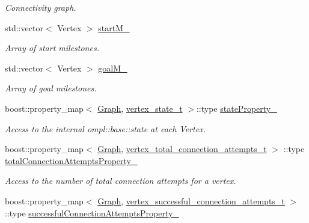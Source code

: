 \begin{DoxyCompactItemize}
\begin{DoxyCompactList}\small\item\em \-Connectivity graph. \end{DoxyCompactList}\item 
\hypertarget{class_f_i_r_m_a333c7dec34b4c0977f85424b9fc3dc21}{std\-::vector$<$ \-Vertex $>$ \hyperlink{class_f_i_r_m_a333c7dec34b4c0977f85424b9fc3dc21}{start\-M\-\_\-}}\label{class_f_i_r_m_a333c7dec34b4c0977f85424b9fc3dc21}

\begin{DoxyCompactList}\small\item\em \-Array of start milestones. \end{DoxyCompactList}\item 
\hypertarget{class_f_i_r_m_aeb59b6121e120e14f30c58e567ec6a4c}{std\-::vector$<$ \-Vertex $>$ \hyperlink{class_f_i_r_m_aeb59b6121e120e14f30c58e567ec6a4c}{goal\-M\-\_\-}}\label{class_f_i_r_m_aeb59b6121e120e14f30c58e567ec6a4c}

\begin{DoxyCompactList}\small\item\em \-Array of goal milestones. \end{DoxyCompactList}\item 
\hypertarget{class_f_i_r_m_a8f27981600a6b5ee4c5124b8f9bc640b}{boost\-::property\-\_\-map$<$ \hyperlink{class_f_i_r_m_a687e9f4243b22c30ee1fa5da22a85053}{\-Graph}, \*
\hyperlink{struct_f_i_r_m_1_1vertex__state__t}{vertex\-\_\-state\-\_\-t} $>$\-::type \hyperlink{class_f_i_r_m_a8f27981600a6b5ee4c5124b8f9bc640b}{state\-Property\-\_\-}}\label{class_f_i_r_m_a8f27981600a6b5ee4c5124b8f9bc640b}

\begin{DoxyCompactList}\small\item\em \-Access to the internal ompl\-::base\-::state at each \-Vertex. \end{DoxyCompactList}\item 
\hypertarget{class_f_i_r_m_a5651af4be68cf84115fbf6fe4b2c958d}{boost\-::property\-\_\-map$<$ \hyperlink{class_f_i_r_m_a687e9f4243b22c30ee1fa5da22a85053}{\-Graph}, \*
\hyperlink{struct_f_i_r_m_1_1vertex__total__connection__attempts__t}{vertex\-\_\-total\-\_\-connection\-\_\-attempts\-\_\-t} $>$\*
\-::type \hyperlink{class_f_i_r_m_a5651af4be68cf84115fbf6fe4b2c958d}{total\-Connection\-Attempts\-Property\-\_\-}}\label{class_f_i_r_m_a5651af4be68cf84115fbf6fe4b2c958d}

\begin{DoxyCompactList}\small\item\em \-Access to the number of total connection attempts for a vertex. \end{DoxyCompactList}\item 
\hypertarget{class_f_i_r_m_ad9d31e5b2a0bf5921fb1c8f43e55338b}{boost\-::property\-\_\-map$<$ \hyperlink{class_f_i_r_m_a687e9f4243b22c30ee1fa5da22a85053}{\-Graph}, \*
\hyperlink{struct_f_i_r_m_1_1vertex__successful__connection__attempts__t}{vertex\-\_\-successful\-\_\-connection\-\_\-attempts\-\_\-t} $>$\*
\-::type \hyperlink{class_f_i_r_m_ad9d31e5b2a0bf5921fb1c8f43e55338b}{successful\-Connection\-Attempts\-Property\-\_\-}}\label{class_f_i_r_m_ad9d31e5b2a0bf5921fb1c8f43e55338b}


\end{DoxyCompactItemize}
